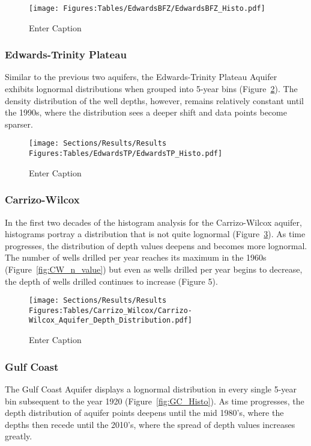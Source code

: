 \begin{figure}[H]
    \centering
    \texttt{[image: Figures:Tables/EdwardsBFZ/EdwardsBFZ\_Histo.pdf]}
    \caption{Enter Caption}
    \label{fig:EBFZ_Histo}
\end{figure}

\subsubsection*{Edwards-Trinity Plateau}
Similar to the previous two aquifers, the Edwards-Trinity Plateau Aquifer exhibits lognormal distributions when grouped into 5-year bins (Figure~\ref{fig:ETP_Histo}). The density distribution of the well depths, however, remains relatively constant until the 1990s, where the distribution sees a deeper shift and data points become sparser. 

\begin{figure}[H]
    \centering
    \texttt{[image: Sections/Results/Results Figures:Tables/EdwardsTP/EdwardsTP\_Histo.pdf]}
    \caption{Enter Caption}
    \label{fig:ETP_Histo}
\end{figure}

\subsubsection*{Carrizo-Wilcox}
In the first two decades of the histogram analysis for the Carrizo-Wilcox aquifer, histograms portray a distribution that is not quite lognormal (Figure~\ref{fig:CW_Histo}). As time progresses, the distribution of depth values deepens and becomes more lognormal. The number of wells drilled per year reaches its maximum in the 1960s (Figure~\ref{fig:CW_n_value}) but even as wells drilled per year begins to decrease, the depth of wells drilled continues to increase (Figure 5).

\begin{figure}[H]
    \centering
    \texttt{[image: Sections/Results/Results Figures:Tables/Carrizo\_Wilcox/Carrizo-Wilcox\_Aquifer\_Depth\_Distribution.pdf]}
    \caption{Enter Caption}
    \label{fig:CW_Histo}
\end{figure}

\subsubsection*{Gulf Coast}
The Gulf Coast Aquifer displays a lognormal distribution in every single 5-year bin subsequent to the year 1920 (Figure~\ref{fig:GC_Histo}). As time progresses, the depth distribution of aquifer points deepens until the mid 1980’s, where the depths then recede until the 2010’s, where the spread of depth values increases greatly.

